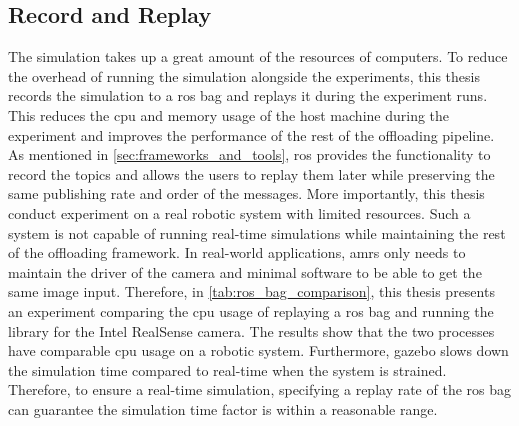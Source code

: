 
\subsection{Record and Replay}

The simulation takes up a great amount of the resources of computers. To reduce the overhead of running the simulation alongside the experiments, this thesis records the simulation to a \gls{ros} bag and replays it during the experiment runs. This reduces the \gls{cpu} and memory usage of the host machine during the experiment and improves the performance of the rest of the offloading pipeline. As mentioned in \cref{sec:frameworks_and_tools}, \gls{ros} provides the functionality to record the topics and allows the users to replay them later while preserving the same publishing rate and order of the messages. More importantly, this thesis conduct experiment on a real robotic system with limited resources. Such a system is not capable of running real-time simulations while maintaining the rest of the offloading framework. In real-world applications, \glspl{amr} only needs to maintain the driver of the camera and minimal software to be able to get the same image input. Therefore, in \cref{tab:ros_bag_comparison}, this thesis presents an experiment comparing the \gls{cpu} usage of replaying a \gls{ros} bag and running the library for the Intel RealSense camera. The results show that the two processes have comparable \gls{cpu} usage on a robotic system. Furthermore, \gls{gazebo} slows down the simulation time compared to real-time when the system is strained. Therefore, to ensure a real-time simulation, specifying a replay rate of the \gls{ros} bag can guarantee the simulation time factor is within a reasonable range. 

